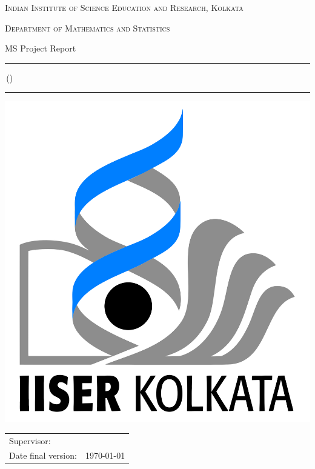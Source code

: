 \begin{titlepage}
	\makeatletter
	\begin{center}
		\textsc{Indian Institute of Science Education and Research, Kolkata} %
		\par \textsc{Department of Mathematics and Statistics} %
		\par MS Project Report \program %

		\vfill \hrule height .08em \bigskip
		\par\huge\@title\bigskip
		\par\Large\@author\,(\studentnumber)\bigskip
		\hrule height .08em\normalsize

		\vfill %
		\includegraphics[width=\textwidth,height=0.15\textheight,keepaspectratio]{logo}
		\vfill

		\begin{tabular}{ll}
			\toprule
			Supervisor: & \supervisor\\
			Date final version: & \today\\
			\bottomrule
		\end{tabular}

		\vfill
	\end{center}
	\makeatother
\end{titlepage}
